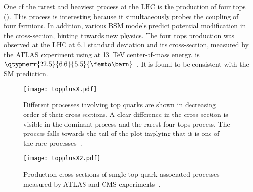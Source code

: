 One of the rarest and heaviest process at the LHC is the production of four tops (\tttt).
This process is interesting because it simultaneously probes the coupling of four 
fermions. In addition, various BSM models predict potential modification in the 
cross-section, hinting towards new physics. The four tops production was observed 
at the LHC at 6.1 standard deviation and its
cross-section, measured by the ATLAS experiment using \lumi at \SI{13}{\TeV} center-of-mass energy,
is $\qtypmerr{22.5}{6.6}{5.5}{\femto\barn}$~\cite{TOPQ-2021-08}. It is found to be consistent with the SM prediction.

\begin{figure}[htbp]
    \centering
    \texttt{[image: topplusX.pdf]}
    \caption[Production 
    cross-sections of various top quark associated processes]{Different processes involving
    top quarks are shown in decreasing order of their cross-sections. 
    A clear difference in the cross-section is visible in the dominant \ttbar process and 
    the rarest four tops process. The \tZq process falls towards the tail of the plot implying
    that it is one of the rare processes~\cite{ATL-PHYS-PUB-2024-006}.}%
    \label{fig:topX_cs}
\end{figure}

\begin{figure}[htbp]
    \centering
    \texttt{[image: topplusX2.pdf]}
    \caption[Production 
    cross-sections of single top quark associated processes]{Production 
    cross-sections of single top quark associated processes measured by ATLAS and CMS experiments~\cite{ATL-PHYS-PUB-2024-005}.}%
    \label{fig:topX2_cs}
\end{figure}







